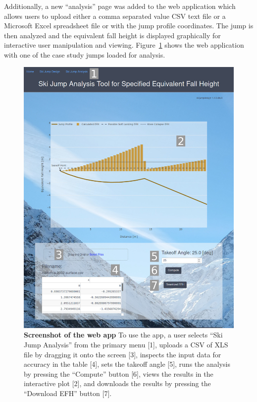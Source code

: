 \documentclass{article}
\begin{document}
Additionally, a new
``analysis'' page was added to the web application which allows users to upload
either a comma separated value CSV text file or a Microsoft Excel spreadsheet
file or with the jump profile coordinates. The jump is then analyzed and the
equivalent fall height is displayed graphically for interactive user
manipulation and viewing. Figure~\ref{fig:web-app-screenshot} shows the web
application with one of the case study jumps loaded for analysis.
%
\begin{figure}
  \centering
  \includegraphics[width=5.00in]{figures/web-app-screenshot.png}
  \caption{\textbf{Screenshot of the web app} To use the app, a user selects
    ``Ski Jump Analysis'' from the primary menu [1], uploads a CSV of XLS file
    by dragging it onto the screen [3], inspects the input data for accuracy in
    the table [4], sets the takeoff angle [5], runs the analysis by pressing
    the ``Compute'' button [6], views the results in the interactive plot [2],
    and downloads the results by pressing the ``Download EFH'' button [7].}
  \label{fig:web-app-screenshot}
\end{figure}
\end{document}
